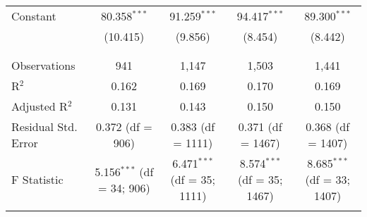 \documentclass{article}
\begin{document}
\begin{table}[!htbp]
{\begin{tabular}{@{\extracolsep{5pt}}lcccc}
 Constant & 80.358$^{***}$ & 91.259$^{***}$ & 94.417$^{***}$ & 89.300$^{***}$ \\ 
  & (10.415) & (9.856) & (8.454) & (8.442) \\ 
  & & & & \\ 
\hline \\[-1.8ex] 
Observations & 941 & 1,147 & 1,503 & 1,441 \\ 
R$^{2}$ & 0.162 & 0.169 & 0.170 & 0.169 \\ 
Adjusted R$^{2}$ & 0.131 & 0.143 & 0.150 & 0.150 \\ 
Residual Std. Error & 0.372 (df = 906) & 0.383 (df = 1111) & 0.371 (df = 1467) & 0.368 (df = 1407) \\ 
F Statistic & 5.156$^{***}$ (df = 34; 906) & 6.471$^{***}$ (df = 35; 1111) & 8.574$^{***}$ (df = 35; 1467) & 8.685$^{***}$ (df = 33; 1407) \\ 
\hline 
\hline \\[-1.8ex] 
\end{tabular} }
\end{table} 
\end{document}
